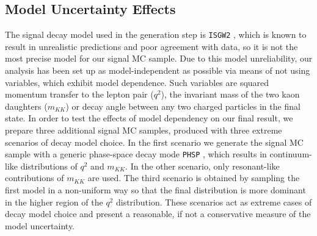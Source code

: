 \subsection{Model Uncertainty Effects}
The signal decay model used in the generation step is \texttt{ISGW2} \cite{Scora:1995ty}, which is known to result in unrealistic predictions and poor agreement with data, so it is not the most precise model for our signal MC sample. Due to this model unreliability, our analysis has been set up as model-independent as possible via means of not using variables, which exhibit model dependence. Such variables are squared momentum transfer to the lepton pair ($q^2$), the invariant mass of the two kaon daughters ($m_{KK}$) or decay angle between any two charged particles in the final state.
In order to test the effects of model dependency on our final result, we prepare three additional signal MC samples, produced with three extreme scenarios of decay model choice. In the first scenario we generate the signal MC sample with a generic phase-space decay mode \texttt{PHSP} \cite{lange2001evtgen}, which results in continuum-like distributions of $q^2$ and $m_{KK}$. In the other scenario, only resonant-like contributions of $m_{KK}$ are used. The third scenario is obtained by sampling the first model in a non-uniform way so that the final distribution is more dominant in the higher region of the $q^2$ distribution. These scenarios act as extreme cases of decay model choice and present a reasonable, if not a conservative measure of the model uncertainty. 

